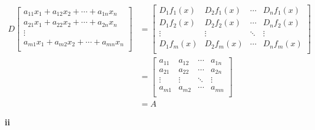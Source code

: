 \documentclass[letterpaper,12pt]{article}
\theoremstyle{definition}
\begin{document}
\begin{align*}
    D\begin{bmatrix}
        a_{11}x_1 +  a_{12}x_2 +  \cdots + a_{1n}x_n \\
        a_{21}x_1 + a_{22}x_2 + \cdots + a_{2n}x_n \\
        \vdots \\
        a_{m1}x_1 + a_{m2}x_2 + \cdots + a_{mn}x_n \\
    \end{bmatrix} 
    &=
    \begin{bmatrix}
    D_1f_1(x) &D_2f_1(x) & \cdots &D_nf_1(x)  \\
    D_1f_2(x) &D_2f_2(x) & \cdots &D_nf_2(x)  \\
    \vdots & \vdots & \ddots & \vdots \\
    D_1f_m(x) &D_2f_m(x) & \cdots &D_nf_m(x)  \\
    \end{bmatrix}
    \\ &=
    \begin{bmatrix}
        a_{11} & a_{12} & \cdots & a_{1n} \\
        a_{21} & a_{22} & \cdots & a_{2n} \\
        \vdots & \vdots & \ddots & \vdots \\
        a_{m1} & a_{m2} & \cdots & a_{mn} \\
    \end{bmatrix}
    \\ &=A
\end{align*}

\textbf{ii}
\end{document}
